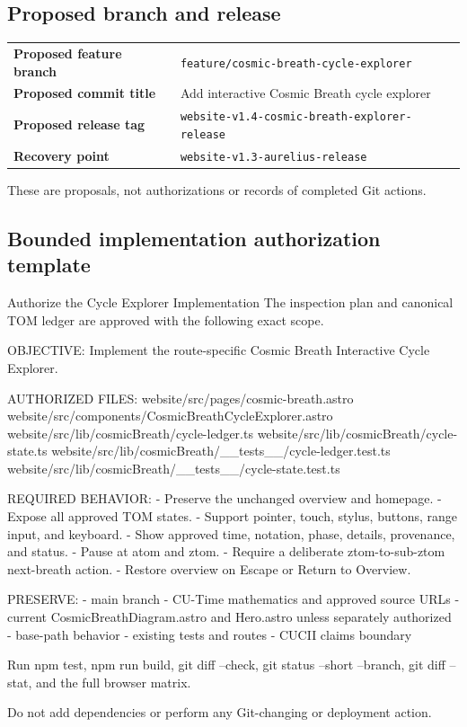 \documentclass[11pt,letterpaper]{article}
\newcommand{\branchname}[1]{\texttt{#1}}
\newcommand{\release}[1]{\texttt{#1}}
\begin{document}
\subsection{Proposed branch and release}
\begin{tabularx}{\textwidth}{>{\bfseries}L{2.1in}Y}
Proposed feature branch & \branchname{feature/cosmic-breath-cycle-explorer} \\
Proposed commit title & Add interactive Cosmic Breath cycle explorer \\
Proposed release tag & \release{website-v1.4-cosmic-breath-explorer-release} \\
Recovery point & \release{website-v1.3-aurelius-release} \\
\end{tabularx}
These are proposals, not authorizations or records of completed Git actions.

\subsection{Bounded implementation authorization template}
\begin{promptbox}{Authorize the Cycle Explorer Implementation}
The inspection plan and canonical TOM ledger are approved with the
following exact scope.

OBJECTIVE:
Implement the route-specific Cosmic Breath Interactive Cycle Explorer.

AUTHORIZED FILES:
website/src/pages/cosmic-breath.astro
website/src/components/CosmicBreathCycleExplorer.astro
website/src/lib/cosmicBreath/cycle-ledger.ts
website/src/lib/cosmicBreath/cycle-state.ts
website/src/lib/cosmicBreath/__tests__/cycle-ledger.test.ts
website/src/lib/cosmicBreath/__tests__/cycle-state.test.ts

REQUIRED BEHAVIOR:
- Preserve the unchanged overview and homepage.
- Expose all approved TOM states.
- Support pointer, touch, stylus, buttons, range input, and keyboard.
- Show approved time, notation, phase, details, provenance, and status.
- Pause at atom and ztom.
- Require a deliberate ztom-to-sub-ztom next-breath action.
- Restore overview on Escape or Return to Overview.

PRESERVE:
- main branch
- CU-Time mathematics and approved source URLs
- current CosmicBreathDiagram.astro and Hero.astro unless separately authorized
- base-path behavior
- existing tests and routes
- CUCII claims boundary

Run npm test, npm run build, git diff --check, git status
--short --branch, git diff --stat, and the full browser matrix.

Do not add dependencies or perform any Git-changing or deployment action.
\end{promptbox}
\end{document}
